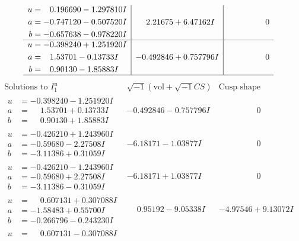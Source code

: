 \documentclass[1p]{elsarticle_modified}
\theoremstyle{definition}
\newcommand{\I}{\sqrt{-1}}
\begin{document}
$$\begin{array}{c|c|c}
\begin{aligned}
u &= \phantom{-}0.196690 - 1.297810 I \\
a &= -0.747120 - 0.507520 I \\
b &= -0.657638 - 0.978220 I\end{aligned}
 & \phantom{-}2.21675 + 6.47162 I & \phantom{-0.000000 } 0 \\ \hline\begin{aligned}
u &= -0.398240 + 1.251920 I \\
a &= \phantom{-}1.53701 - 0.13733 I \\
b &= \phantom{-}0.90130 - 1.85883 I\end{aligned}
 & -0.492846 + 0.757796 I & \phantom{-0.000000 } 0\\
 \hline 
 \end{array}$$\newpage$$\begin{array}{c|c|c}  
\text{Solutions to }I^u_{1}& \I (\text{vol} + \sqrt{-1}CS) & \text{Cusp shape}\\
 \hline 
\begin{aligned}
u &= -0.398240 - 1.251920 I \\
a &= \phantom{-}1.53701 + 0.13733 I \\
b &= \phantom{-}0.90130 + 1.85883 I\end{aligned}
 & -0.492846 - 0.757796 I & \phantom{-0.000000 } 0 \\ \hline\begin{aligned}
u &= -0.426210 + 1.243960 I \\
a &= -0.59680 - 2.27508 I \\
b &= -3.11386 + 0.31059 I\end{aligned}
 & -6.18171 - 1.03877 I & \phantom{-0.000000 } 0 \\ \hline\begin{aligned}
u &= -0.426210 - 1.243960 I \\
a &= -0.59680 + 2.27508 I \\
b &= -3.11386 - 0.31059 I\end{aligned}
 & -6.18171 + 1.03877 I & \phantom{-0.000000 } 0 \\ \hline\begin{aligned}
u &= \phantom{-}0.607131 + 0.307088 I \\
a &= -1.58483 + 0.55700 I \\
b &= -0.266796 - 0.243230 I\end{aligned}
 & \phantom{-}0.95192 - 9.05338 I & -4.97546 + 9.13072 I \\ \hline\begin{aligned}
u &= \phantom{-}0.607131 - 0.307088 I \\

\end{aligned}
\end{array}$$
\end{document}
